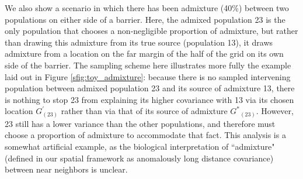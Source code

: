 \documentclass[12pt]{article}
\newcommand{\identifyadmixsource}[1]{{#1^{*}}}
\newcommand{\gb}[1]{{\it\color{magenta}{(#1)}}}
\newcommand{\plr}[1]{{\it\color{green}{(#1)}}}
\begin{document}

We also show a scenario in which there has been admixture (40\%) between two populations on either side of a barrier.  Here, the admixed population 23 is the only population that chooses a non-negligible proportion of admixture, but rather than drawing this admixture from its true source (population 13), it draws admixture from a location on the far margin of the half of the grid on its own side of the barrier.  The sampling scheme here illustrates more fully the example laid out in Figure \ref{sfig:toy_admixture}: because there is no sampled intervening population between admixed population 23 and its source of admixture 13, there is nothing to stop 23 from explaining its higher covariance with 13 via its chosen location $G_{(23)}^{\prime}$ rather than via that of its source of admixture $\identifyadmixsource{G}_{(23)}$.  
\plr{I think that the model is still identifiable (am thinking about that math); the problem is that the posterior is pretty flat, right?}
However, 23 still has a lower variance than the other populations, and therefore must choose a proportion of admixture to accommodate that fact.  This analysis is a somewhat artificial example, as the biological interpretation of ``admixture" (defined in our spatial framework as anomalously long distance covariance) between near neighbors is unclear.
\end{document}
